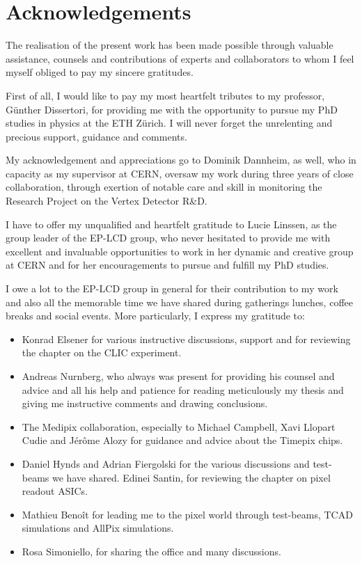 \chapter{Acknowledgements}
\label{sec:ack}

The realisation of the present work has been made possible through
valuable assistance, counsels and contributions of experts and
collaborators to whom I feel myself obliged to pay my sincere
gratitudes.

First of all, I would like to pay my most heartfelt tributes to my
professor, Günther Dissertori, for providing me with the opportunity
to pursue my PhD studies in physics at the ETH Zürich. I will never
forget the unrelenting and precious support, guidance and comments.


My acknowledgement and appreciations go to Dominik Dannheim, as well,
who in capacity as my supervisor at CERN, oversaw my work during three
years of close collaboration, through exertion of notable care and
skill in monitoring the Research Project on the Vertex Detector R\&D.

I have to offer my unqualified and heartfelt gratitude to Lucie
Linssen, as the group leader of the EP-LCD group, who never hesitated
to provide me with excellent and invaluable opportunities to work in
her dynamic and creative group at CERN and for her encouragements to
pursue and fulfill my PhD studies.

I owe a lot to the EP-LCD group in general for their contribution to
my work and also all the memorable time we have shared during
gatherings lunches, coffee breaks and social events. More
particularly, I express my gratitude to:

\begin{itemize}
\item Konrad Elsener for various instructive discussions, support and
  for reviewing the chapter on the CLIC experiment.

\item Andreas Nurnberg, who always was present for providing his
  counsel and advice and all his help and patience for reading
  meticulously my thesis and giving me instructive comments and
  drawing conclusions.

\item The Medipix collaboration, especially to Michael Campbell, Xavi
  Llopart Cudie and Jérôme Alozy for guidance and advice about the
  Timepix chips.

\item Daniel Hynds and Adrian Fiergolski for the various discussions
  and test-beams we have shared. Edinei Santin, for reviewing the
  chapter on pixel readout ASICs.

\item Mathieu Benoît for leading me to the pixel world through
  test-beams, TCAD simulations and AllPix simulations.

\item Rosa Simoniello, for sharing the office and many discussions.
\end{itemize}

